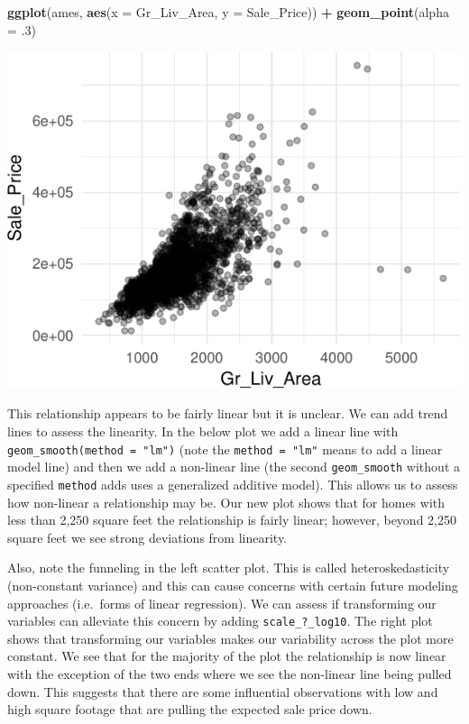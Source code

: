 \documentclass[]{article}
\newenvironment{Shaded}{\begin{snugshade}}{\end{snugshade}}
\newcommand{\KeywordTok}[1]{\textcolor[rgb]{0.13,0.29,0.53}{\textbf{#1}}}
\newcommand{\DataTypeTok}[1]{\textcolor[rgb]{0.13,0.29,0.53}{#1}}
\newcommand{\DecValTok}[1]{\textcolor[rgb]{0.00,0.00,0.81}{#1}}
\newcommand{\StringTok}[1]{\textcolor[rgb]{0.31,0.60,0.02}{#1}}
\newcommand{\OperatorTok}[1]{\textcolor[rgb]{0.81,0.36,0.00}{\textbf{#1}}}
\newcommand{\NormalTok}[1]{#1}
\begin{document}
\begin{Shaded}
\begin{Highlighting}[]
\KeywordTok{ggplot}\NormalTok{(ames, }\KeywordTok{aes}\NormalTok{(}\DataTypeTok{x =}\NormalTok{ Gr_Liv_Area, }\DataTypeTok{y =}\NormalTok{ Sale_Price)) }\OperatorTok{+}
\StringTok{  }\KeywordTok{geom_point}\NormalTok{(}\DataTypeTok{alpha =}\NormalTok{ .}\DecValTok{3}\NormalTok{)}
\end{Highlighting}
\end{Shaded}

\begin{center}\includegraphics{Chapter_3_-_Visualization_files/figure-latex/scatter1-1} \end{center}

This relationship appears to be fairly linear but it is unclear. We can
add trend lines to assess the linearity. In the below plot we add a
linear line with \texttt{geom\_smooth(method\ =\ "lm")} (note the
\texttt{method\ =\ "lm"} means to add a linear model line) and then we
add a non-linear line (the second \texttt{geom\_smooth} without a
specified \texttt{method} adds uses a generalized additive model). This
allows us to assess how non-linear a relationship may be. Our new plot
shows that for homes with less than 2,250 square feet the relationship
is fairly linear; however, beyond 2,250 square feet we see strong
deviations from linearity.

Also, note the funneling in the left scatter plot. This is called
heteroskedasticity (non-constant variance) and this can cause concerns
with certain future modeling approaches (i.e.~forms of linear
regression). We can assess if transforming our variables can alleviate
this concern by adding \texttt{scale\_?\_log10}. The right plot shows
that transforming our variables makes our variability across the plot
more constant. We see that for the majority of the plot the relationship
is now linear with the exception of the two ends where we see the
non-linear line being pulled down. This suggests that there are some
influential observations with low and high square footage that are
pulling the expected sale price down.
\end{document}
